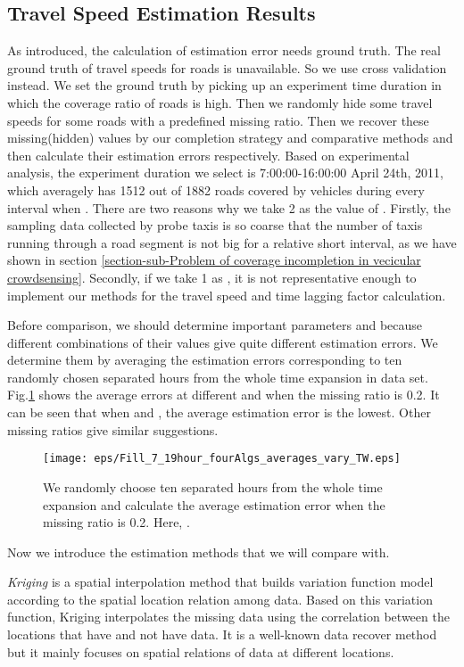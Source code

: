 \documentclass[twocolumn,10pt,final,conference]{IEEEtran}
\begin{document}
\subsection{Travel Speed Estimation Results}\label{section-expe-current}
As introduced, the calculation of estimation error needs ground truth. The real ground truth of travel speeds for roads is unavailable. So we use cross validation instead. We set the ground truth by picking up an experiment time duration in which the coverage ratio of roads is high. Then we randomly hide some travel speeds for some roads with a predefined missing ratio. Then we recover these missing(hidden) values by our completion strategy and comparative methods and then calculate their estimation errors respectively. Based on experimental analysis, the experiment duration we select is 7:00:00-16:00:00 April 24th, 2011, which averagely has 1512 out of 1882 roads covered by vehicles during every interval when . There are two reasons why we take 2 as the value of . Firstly, the sampling data collected by probe taxis is so coarse that the number of taxis running through a road segment is not big for a relative short interval, as we have shown in section \ref{section-sub-Problem of coverage incompletion in vecicular crowdsensing}. Secondly, if we take 1 as , it is not representative enough to implement our methods for the travel speed and time lagging factor calculation.

Before comparison, we should determine important parameters  and  because different combinations of their values give quite different estimation errors. We determine them by averaging the estimation errors corresponding to ten randomly chosen separated hours from the whole time expansion in data set. Fig.\ref{fig-fill-difft-w-STC} shows the average errors at different  and  when the missing ratio is 0.2. It can be seen that when  and , the average estimation error is the lowest. Other missing ratios give similar suggestions.

\begin{figure}[h]
  \centering
  \texttt{[image: eps/Fill\_7\_19hour\_fourAlgs\_averages\_vary\_TW.eps]}\\
  \caption{We randomly choose ten separated hours from the whole time expansion and calculate the average estimation error when the missing ratio is 0.2. Here, .}
  \label{fig-fill-difft-w-STC}
\end{figure}
Now we introduce the estimation methods that we will compare with.

\emph{Kriging} is a spatial interpolation method that builds variation function model according to the spatial location relation among data\cite{Ref82}\cite{Ref90}. Based on this variation function, Kriging interpolates the missing data using the correlation between the locations that have and not have data. It is a well-known data recover method but it mainly focuses on spatial relations of data at different locations.
\end{document}
